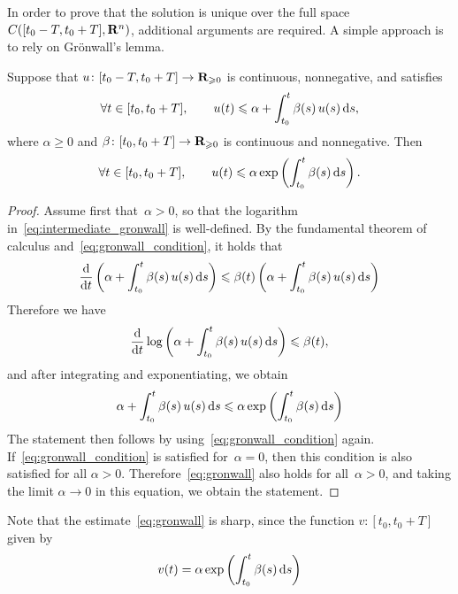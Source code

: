 In order to prove that the solution is unique over the full space $C([t_0-T, t_0+T], \mathbf R^n)$,
additional arguments are required.
A simple approach is to rely on Gr\"onwall's lemma.
\begin{lemma}
    Suppose that $u \colon [t_0-T, t_0+T] \to \mathbf R_{\geqslant 0}$ is continuous, nonnegative, and satisfies
    \begin{equation}
        \label{eq:gronwall_condition}
        \forall t \in [t_0, t_0+T], \qquad
        u(t) \leqslant \alpha + \int_{t_0}^{t} \beta(s) \, u(s) \, \mathrm d s,
    \end{equation}
    where $\alpha \geq 0$ and $\beta\colon [t_0, t_0 + T] \to \mathbf R_{\geqslant 0}$ is continuous and nonnegative.
    Then
    \begin{equation}
        \label{eq:gronwall}
        \forall t \in [t_0, t_0+T], \qquad
        u(t) \leqslant \alpha \exp \left( \int_{t_0}^{t} \beta(s) \, \mathrm d s \right).
    \end{equation}
\end{lemma}
\begin{proof}
    Assume first that~$\alpha > 0$,
    so that the logarithm in~\eqref{eq:intermediate_gronwall} is well-defined.
    By the fundamental theorem of calculus and~\eqref{eq:gronwall_condition},
    it holds that
    \[
        \frac{\mathrm d}{\mathrm d t} \left( \alpha + \int_{t_0}^{t} \beta(s) \, u(s) \, \mathrm d s \right)
        \leqslant \beta(t) \left( \alpha + \int_{t_0}^{t} \beta(s) \, u(s) \, \mathrm d s \right)
    \]
    Therefore we have
    \begin{equation}
        \label{eq:intermediate_gronwall}
        \frac{\mathrm d}{\mathrm d t} \log \left( \alpha + \int_{t_0}^{t} \beta(s) \, u(s) \, \mathrm d s \right) \leqslant \beta(t),
    \end{equation}
    and after integrating and exponentiating,
    we obtain
    \[
        \alpha + \int_{t_0}^{t} \beta(s) \, u(s) \, \mathrm d s
        \leqslant \alpha \exp \left( \int_{t_0}^{t} \beta(s) \, \mathrm d s \right)
    \]
    The statement then follows by using~\eqref{eq:gronwall_condition} again.
    If~\eqref{eq:gronwall_condition} is satisfied for~$\alpha = 0$,
    then this condition is also satisfied for all $\alpha > 0$.
    Therefore~\eqref{eq:gronwall} also holds for all~$\alpha > 0$,
    and taking the limit $\alpha \to 0$ in this equation,
    we obtain the statement.
\end{proof}
Note that the estimate~\eqref{eq:gronwall} is sharp,
since the function $v \colon [t_0, t_0 + T]$ given by
\[
    v(t) = \alpha \exp \left( \int_{t_0}^{t} \beta(s) \, \mathrm d s \right)
\]
